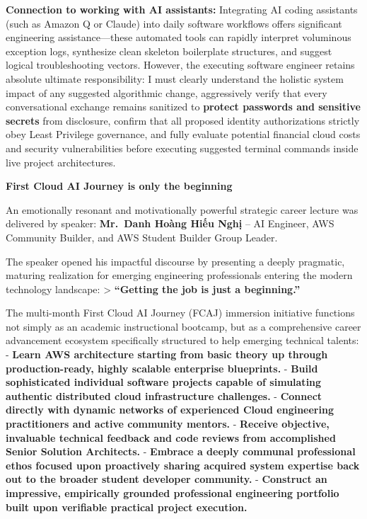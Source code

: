\textbf{Connection to working with AI assistants:} Integrating AI coding
assistants (such as Amazon Q or Claude) into daily software workflows
offers significant engineering assistance---these automated tools can
rapidly interpret voluminous exception logs, synthesize clean skeleton
boilerplate structures, and suggest logical troubleshooting vectors.
However, the executing software engineer retains absolute ultimate
responsibility: I must clearly understand the holistic system impact of
any suggested algorithmic change, aggressively verify that every
conversational exchange remains sanitized to \textbf{protect passwords
and sensitive secrets} from disclosure, confirm that all proposed
identity authorizations strictly obey Least Privilege governance, and
fully evaluate potential financial cloud costs and security
vulnerabilities before executing suggested terminal commands inside live
project architectures.

\vspace{0.5em}\noindent\textbf{First Cloud AI Journey is only the
beginning}\par

An emotionally resonant and motivationally powerful strategic career
lecture was delivered by speaker: \textbf{Mr.~Danh Hoàng Hiếu Nghị} --
AI Engineer, AWS Community Builder, and AWS Student Builder Group
Leader.

The speaker opened his impactful discourse by presenting a deeply
pragmatic, maturing realization for emerging engineering professionals
entering the modern technology landscape: \textgreater{}
\textbf{``Getting the job is just a beginning.''}

The multi-month First Cloud AI Journey (FCAJ) immersion initiative
functions not simply as an academic instructional bootcamp, but as a
comprehensive career advancement ecosystem specifically structured to
help emerging technical talents: - \textbf{Learn AWS architecture
starting from basic theory up through production-ready, highly scalable
enterprise blueprints.} - \textbf{Build sophisticated individual
software projects capable of simulating authentic distributed cloud
infrastructure challenges.} - \textbf{Connect directly with dynamic
networks of experienced Cloud engineering practitioners and active
community mentors.} - \textbf{Receive objective, invaluable technical
feedback and code reviews from accomplished Senior Solution Architects.}
- \textbf{Embrace a deeply communal professional ethos focused upon
proactively sharing acquired system expertise back out to the broader
student developer community.} - \textbf{Construct an impressive,
empirically grounded professional engineering portfolio built upon
verifiable practical project execution.}

